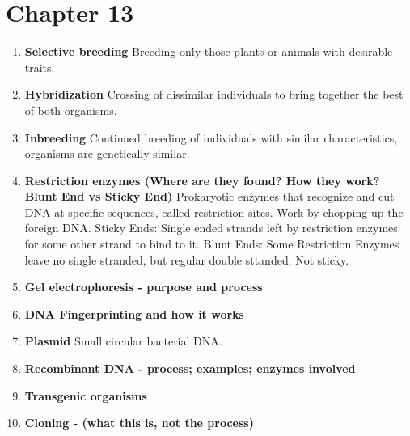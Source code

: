 \documentclass[9pt]{article}
\begin{document}
\section*{Chapter 13}
\begin{enumerate}
  \item {\bf Selective breeding} Breeding only those plants or animals
    with desirable traits.
  \item {\bf Hybridization} Crossing of dissimilar individuals to
    bring together the best of both organisms.
  \item {\bf Inbreeding} Continued breeding of individuals with
    similar characteristics, organisms are genetically similar.
  \item {\bf Restriction enzymes (Where are they found? How they work?
    Blunt End vs Sticky End)} Prokaryotic enzymes that recognize and
    cut DNA at specific sequences, called restriction sites. Work by
    chopping up the foreign DNA. Sticky Ends: Single ended strands
    left by restriction enzymes for some other strand to bind to
    it. Blunt Ends: Some Restriction Enzymes leave no single stranded,
    but regular double sttanded. Not sticky.
  \item {\bf Gel electrophoresis  -  purpose and process}
  \item {\bf DNA Fingerprinting and how it works}
  \item {\bf Plasmid} Small circular bacterial DNA.
  \item {\bf Recombinant DNA  -  process; examples; enzymes involved}
  \item {\bf Transgenic organisms}
  \item {\bf Cloning  -  (what this is, not the process)}
\end{enumerate}
\end{document}
